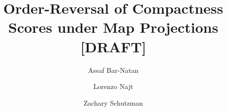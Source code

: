\documentclass[11pt]{article}
\title{Order-Reversal of Compactness Scores under Map Projections [DRAFT]}
\author{Assaf Bar-Natan \and Lorenzo Najt \and Zachary Schutzman }%
\theoremstyle{definition}
\theoremstyle{remark}
\begin{document}
\maketitle
	
\begin{abstract}

\end{abstract}












\end{document}
